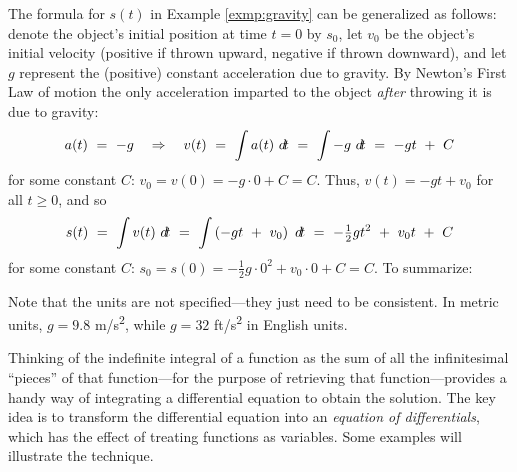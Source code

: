 The formula for $s(t)$ in Example \ref{exmp:gravity} can be generalized as
follows: denote the object's initial position at time $t=0$ by $s_0$,
let $v_0$ be the object's initial velocity (positive if thrown upward,
negative if thrown downward), and let $g$ represent the (positive) constant
acceleration due to gravity. By Newton's First Law of motion the only
acceleration imparted to the object \emph{after} throwing it is due to gravity:
\[
a(t) ~=~ -g \quad\Rightarrow\quad v(t) ~=~ \int a(t)~d\!t ~=~ \int -g~d\!t
~=~ -gt ~+~ C
\]
for some constant $C$:
$v_0 = v(0) = -g \cdot 0 + C = C$. Thus, $v(t) = -gt + v_0$ for all $t \ge 0$,
and so
\[
s(t) ~=~ \int v(t)~d\!t ~=~ \int \left(-gt ~+~ v_0\right)~d\!t ~=~
-\tfrac{1}{2}gt^2 ~+~ v_0t ~+~ C
\]
for some constant $C$:
$s_0 = s(0) = -\tfrac{1}{2}g \cdot 0^2 + v_0 \cdot 0 + C = C$. To summarize:

Note that the units are not specified---they just need to be
consistent. In metric units, $g = 9.8 $ m/s\textsuperscript{2}, while
$g = 32 $ ft/s\textsuperscript{2} in English units.

Thinking of the indefinite integral of a function as the sum of all the
infinitesimal ``pieces'' of that function---for the purpose of retrieving that
function---provides a handy way of integrating a differential equation to obtain
the solution. The key idea is to transform the differential equation into an
\emph{equation of differentials}, which has the effect of treating functions as
variables. Some examples will illustrate the technique.

